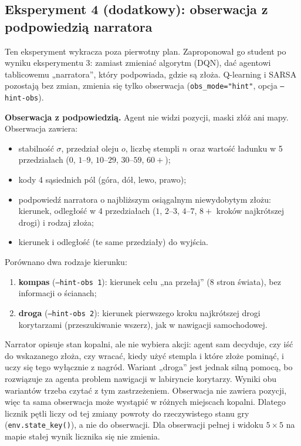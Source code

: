 \documentclass[11pt,a4paper]{article}
\begin{document}
\subsection{Eksperyment 4 (dodatkowy): obserwacja z podpowiedzią narratora}\label{sec:narrator}
Ten eksperyment wykracza poza pierwotny plan. Zaproponował go student po wyniku
eksperymentu 3: zamiast zmieniać algorytm (DQN), dać agentowi tablicowemu
„narratora”, który podpowiada, gdzie są złoża. Q-learning i SARSA pozostają bez zmian,
zmienia się tylko obserwacja (\texttt{obs\_mode="hint"}, opcja \texttt{--hint-obs}).

\textbf{Obserwacja z podpowiedzią.} Agent nie widzi pozycji, maski złóż ani mapy.
Obserwacja zawiera:
\begin{itemize}
  \item stabilność $\sigma$, przedział oleju $o$, liczbę stempli $n$ oraz wartość
  ładunku w 5 przedziałach ($0$, $1$--$9$, $10$--$29$, $30$--$59$, $60+$);
  \item kody 4 sąsiednich pól (góra, dół, lewo, prawo);
  \item podpowiedź narratora o najbliższym osiągalnym niewydobytym złożu: kierunek,
  odległość w 4 przedziałach ($1$, $2$--$3$, $4$--$7$, $8+$ kroków najkrótszej drogi)
  i rodzaj złoża;
  \item kierunek i odległość (te same przedziały) do wyjścia.
\end{itemize}
Porównano dwa rodzaje kierunku:
\begin{enumerate}
  \item \textbf{kompas} (\texttt{--hint-obs 1}): kierunek celu „na przełaj”
  (8 stron świata), bez informacji o ścianach;
  \item \textbf{droga} (\texttt{--hint-obs 2}): kierunek pierwszego kroku najkrótszej
  drogi korytarzami (przeszukiwanie wszerz), jak w nawigacji samochodowej.
\end{enumerate}
Narrator opisuje stan kopalni, ale nie wybiera akcji: agent sam decyduje, czy iść
do wskazanego złoża, czy wracać, kiedy użyć stempla i które złoże pominąć, i uczy się
tego wyłącznie z nagród. Wariant „droga” jest jednak silną pomocą, bo rozwiązuje za
agenta problem nawigacji w labiryncie korytarzy. Wyniki obu wariantów trzeba czytać
z tym zastrzeżeniem. Obserwacja nie zawiera pozycji, więc ta sama obserwacja może
wystąpić w różnych miejscach kopalni. Dlatego licznik pętli liczy od tej zmiany
powroty do rzeczywistego stanu gry (\texttt{env.state\_key()}), a nie do obserwacji.
Dla obserwacji pełnej i widoku $5\times5$ na mapie stałej wynik licznika się nie zmienia.
\end{document}
